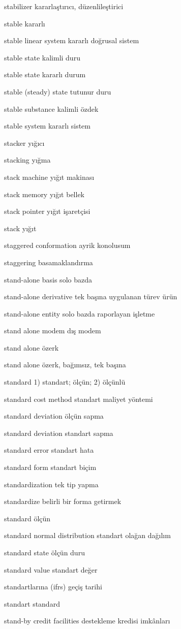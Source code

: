 \documentclass[12pt,fleqn]{article}\usepackage{../../common}
\begin{document}
stabilizer kararlaştırıcı, düzenlileştirici

stable kararlı

stable linear system kararlı doğrusal sistem

stable state kalimli duru

stable state kararlı durum

stable (steady) state tutunur duru

stable substance kalimli özdek

stable system kararlı sistem

stacker yığıcı

stacking yığma

stack machine yığıt makinası

stack memory yığıt bellek

stack pointer yığıt işaretçisi

stack yığıt

staggered conformation ayrik konolusum

staggering basamaklandırma

stand-alone basis solo bazda

stand-alone derivative tek başına uygulanan türev ürün

stand-alone entity solo bazda raporlayan işletme

stand alone modem dış modem

stand alone özerk

stand alone özerk, bağımsız, tek başına

standard 1) standart; ölçün; 2) ölçünlü

standard cost method standart maliyet yöntemi

standard deviation ölçün sapma

standard deviation standart sapma

standard error standart hata

standard form standart biçim

standardization tek tip yapma

standardize belirli bir forma getirmek

standard ölçün

standard normal distribution standart olağan dağılım

standard state ölçün duru

standard value standart değer

standartlarına (ifrs) geçiş tarihi

standart standard

stand-by credit facilities destekleme kredisi imkânları
\end{document}
